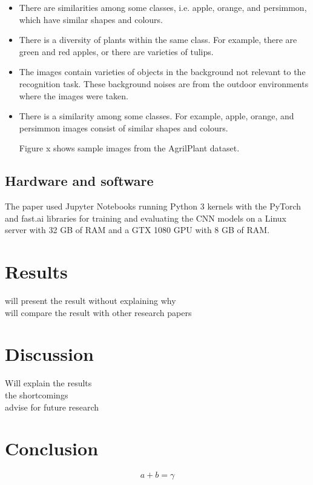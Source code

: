 \documentclass[conference]{IEEEtran}
\begin{document}
 \begin{itemize}
     \item There are similarities among some classes, i.e. apple, orange, and persimmon, which have similar shapes and colours.
     \item There is a diversity of plants within the same class. For example, there are green and red apples, or there are varieties of tulips.
     \item The images contain varieties of objects in the background not relevant to the recognition task. These background noises are from the outdoor environments where the images were taken.
     \item There is a similarity among some classes. For example, apple, orange, and persimmon images consist of similar shapes and colours.

Figure x shows sample images from the AgrilPlant dataset.

 \end{itemize}

\subsection{Hardware and software}
The paper used Jupyter Notebooks \cite{kluyver2016jupyter} running Python 3 kernels with the PyTorch \cite{paszke2017automatic} and fast.ai \cite{howard2018fastai} libraries for training and evaluating the CNN models on a Linux server with 32 GB of RAM and a GTX 1080 GPU with 8 GB of RAM.

\section{Results}
will present the result without explaining why\\
will compare the result with other research papers\\

\section{Discussion}
Will explain the results\\
the shortcomings\\
advise for future research
\section{Conclusion}

\begin{equation}
a+b=\gamma\label{eq}
\end{equation}
\end{document}
